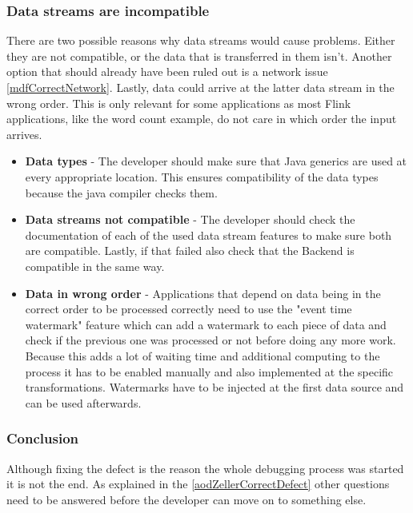 \subsubsection{Data streams are incompatible}
\label{mdfCorrectDataStreams}
There are two possible reasons why data streams would cause problems. Either they are not compatible, or the data that is transferred in them isn't. Another option that should already have been ruled out is a network issue \ref{mdfCorrectNetwork}. Lastly, data could arrive at the latter data stream in the wrong order. This is only relevant for some applications as most Flink applications, like the word count example, do not care in which order the input arrives.
\begin{itemize}
  \item \textbf{Data types} - The developer should make sure that Java generics are used at every appropriate location. This ensures compatibility of the data types because the java compiler checks them.
  \item \textbf{Data streams not compatible} - The developer should check the documentation of each of the used data stream features to make sure both are compatible. Lastly, if that failed also check that the Backend is compatible in the same way.
  \item \textbf{Data in wrong order} - Applications that depend on data being in the correct order to be processed correctly need to use the "event time watermark" feature which can add a watermark to each piece of data and check if the previous one was processed or not before doing any more work. Because this adds a lot of waiting time and additional computing to the process it has to be enabled manually and also implemented at the specific transformations. Watermarks have to be injected at the first data source and can be used afterwards.
\end{itemize}

\subsubsection{Conclusion}
Although fixing the defect is the reason the whole debugging process was started it is not the end. As explained in the \ref{aodZellerCorrectDefect} other questions need to be answered before the developer can move on to something else.

